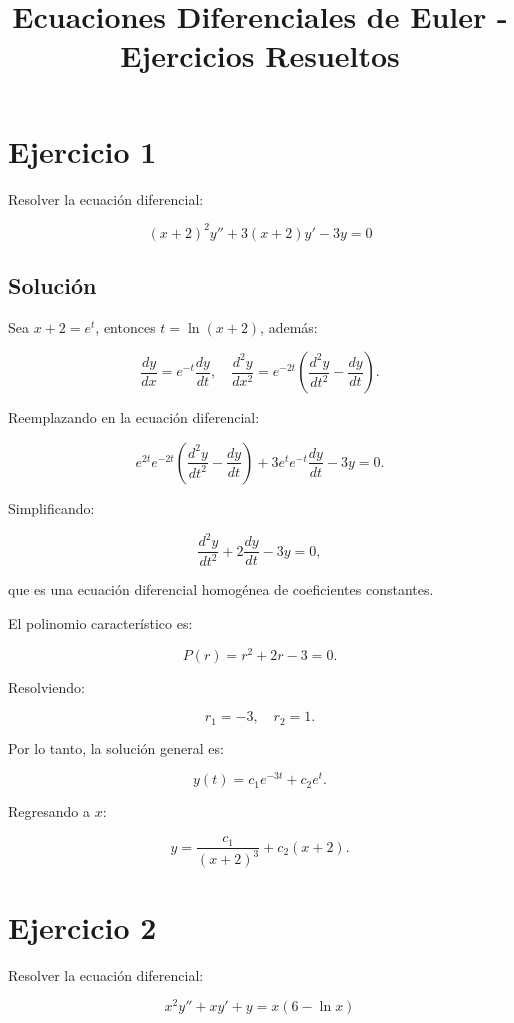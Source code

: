 \documentclass{article}
\begin{document}
\title{Ecuaciones Diferenciales de Euler - Ejercicios Resueltos}
\author{}
\date{}
\maketitle

\section*{Ejercicio 1}

Resolver la ecuación diferencial:

\[
    (x+2)^2 y'' + 3(x+2)y' - 3y = 0
\]

\subsection*{Solución}

Sea $x + 2 = e^t$, entonces $t = \ln (x+2)$, además:

\[
    \frac{dy}{dx} = e^{-t} \frac{dy}{dt}, \quad \frac{d^2 y}{dx^2} = e^{-2t} \left( \frac{d^2 y}{dt^2} - \frac{dy}{dt} \right).
\]

Reemplazando en la ecuación diferencial:

\[
    e^{2t} e^{-2t} \left( \frac{d^2 y}{dt^2} - \frac{dy}{dt} \right) + 3e^t e^{-t} \frac{dy}{dt} - 3y = 0.
\]

Simplificando:

\[
    \frac{d^2 y}{dt^2} + 2 \frac{dy}{dt} - 3y = 0,
\]

que es una ecuación diferencial homogénea de coeficientes constantes.

El polinomio característico es:

\[
    P(r) = r^2 + 2r - 3 = 0.
\]

Resolviendo:

\[
    r_1 = -3, \quad r_2 = 1.
\]

Por lo tanto, la solución general es:

\[
    y(t) = c_1 e^{-3t} + c_2 e^t.
\]

Regresando a $x$:

\[
    y = \frac{c_1}{(x+2)^3} + c_2 (x+2).
\]

\section*{Ejercicio 2}

Resolver la ecuación diferencial:

\[
    x^2 y'' + xy' + y = x(6 - \ln x)
\]
\end{document}
